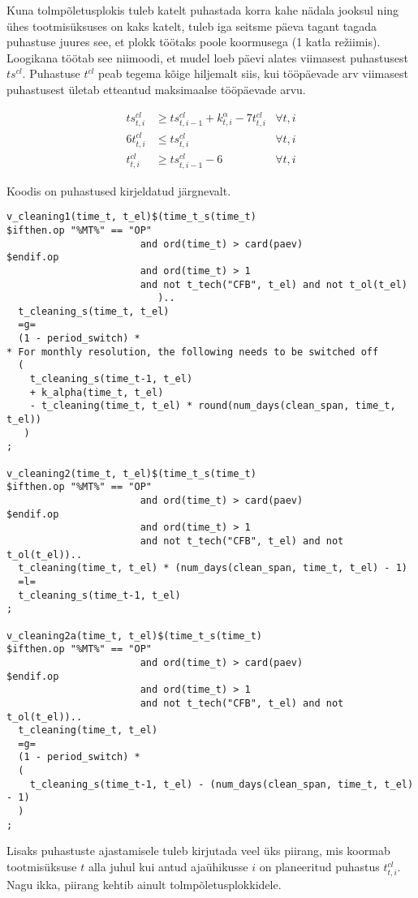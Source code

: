 \documentclass[10pt,a4paper]{article}
\begin{document}
Kuna tolmpõletusplokis tuleb katelt puhastada korra kahe nädala jooksul ning ühes tootmisüksuses on kaks katelt, tuleb iga seitsme päeva tagant tagada puhastuse juures see, et plokk töötaks poole koormusega (1 katla režiimis). Loogikana töötab see niimoodi, et mudel loeb päevi alates viimasest puhastusest $ts^{cl}$. Puhastuse $t^{cl}$ peab tegema kõige hiljemalt siis, kui tööpäevade arv viimasest puhastusest ületab etteantud maksimaalse tööpäevade arvu.

\begin{align}
ts^{cl}_{t,i} &\geq ts^{cl}_{t,i-1} + k^\alpha_{t,i} - 7 t^{cl}_{t,i} &\forall t,i \\
6 t^{cl}_{t,i} &\leq ts^{cl}_{t,i} & \forall t,i \\
t^{cl}_{t,i} & \geq ts^{cl}_{t,i-1} - 6 & \forall t,i
\end{align}

Koodis on puhastused kirjeldatud järgnevalt.

\begin{verbatim}
v_cleaning1(time_t, t_el)$(time_t_s(time_t)
$ifthen.op "%MT%" == "OP"
                       and ord(time_t) > card(paev)
$endif.op
                       and ord(time_t) > 1
                       and not t_tech("CFB", t_el) and not t_ol(t_el)
                          )..
  t_cleaning_s(time_t, t_el)
  =g=
  (1 - period_switch) *
* For monthly resolution, the following needs to be switched off
  (
    t_cleaning_s(time_t-1, t_el)
    + k_alpha(time_t, t_el)
    - t_cleaning(time_t, t_el) * round(num_days(clean_span, time_t, t_el))
   )
;

v_cleaning2(time_t, t_el)$(time_t_s(time_t)
$ifthen.op "%MT%" == "OP"
                       and ord(time_t) > card(paev)
$endif.op
                       and ord(time_t) > 1
                       and not t_tech("CFB", t_el) and not t_ol(t_el))..
  t_cleaning(time_t, t_el) * (num_days(clean_span, time_t, t_el) - 1)
  =l=
  t_cleaning_s(time_t-1, t_el)
;

v_cleaning2a(time_t, t_el)$(time_t_s(time_t)
$ifthen.op "%MT%" == "OP"
                       and ord(time_t) > card(paev)
$endif.op
                       and ord(time_t) > 1
                       and not t_tech("CFB", t_el) and not t_ol(t_el))..
  t_cleaning(time_t, t_el)
  =g=
  (1 - period_switch) *
  (
    t_cleaning_s(time_t-1, t_el) - (num_days(clean_span, time_t, t_el) - 1)
  )
;
\end{verbatim}

Lisaks puhastuste ajastamisele tuleb kirjutada veel üks piirang, mis koormab tootmisüksuse $t$ alla juhul kui antud ajaühikusse $i$ on planeeritud puhastus $t^{cl}_{t,i}$. Nagu ikka, piirang kehtib ainult tolmpõletusplokkidele.
\end{document}
